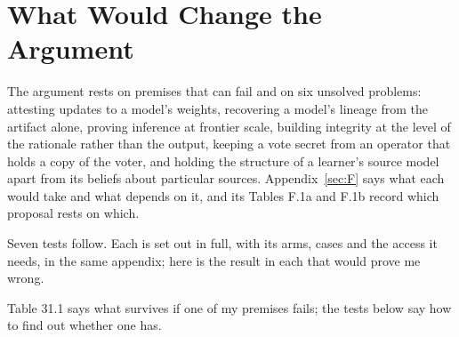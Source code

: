 \chapter{What Would Change the Argument}
\label{sec:31}
The argument rests on premises that can fail and on six unsolved problems: attesting updates to a model's weights, recovering a model's lineage from the artifact alone, proving inference at frontier scale, building integrity at the level of the rationale rather than the output, keeping a vote secret from an operator that holds a copy of the voter, and holding the structure of a learner's source model apart from its beliefs about particular sources. Appendix~\ref{sec:F} says what each would take and what depends on it, and its Tables F.1a and F.1b record which proposal rests on which.

Seven tests follow. Each is set out in full, with its arms, cases and the access it needs, in the same appendix; here is the result in each that would prove me wrong.

Table 31.1 says what survives if one of my premises fails; the tests below say how to find out whether one has.


